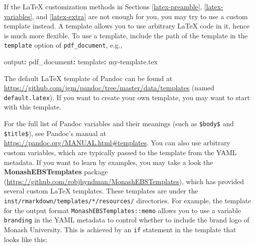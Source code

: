 \documentclass[
  11pt,
]{krantz}
\newenvironment{Shaded}{\begin{snugshade}}{\end{snugshade}}
\newcommand{\AttributeTok}[1]{\textcolor[rgb]{0.61,0.61,0.61}{#1}}
\newcommand{\BuiltInTok}[1]{#1}
\newcommand{\CommentTok}[1]{\textcolor[rgb]{0.37,0.37,0.37}{\textit{#1}}}
\newcommand{\ExtensionTok}[1]{#1}
\newcommand{\FunctionTok}[1]{\textcolor[rgb]{0,0,0}{#1}}
\newcommand{\KeywordTok}[1]{\textcolor[rgb]{0.27,0.27,0.27}{\textbf{#1}}}
\newcommand{\NormalTok}[1]{#1}
\newcommand{\SpecialStringTok}[1]{\textcolor[rgb]{0.5,0.5,0.5}{#1}}
\begin{document}
If the LaTeX customization methods in Sections \ref{latex-preamble}, \ref{latex-variables}, and \ref{latex-extra} are not enough for you, you may try to use a custom template instead. A template allows you to use arbitrary LaTeX code in it, hence is much more flexible. To use a template, include the path of the template in the \texttt{template} option of \texttt{pdf\_document}, e.g.,

\begin{Shaded}
\begin{Highlighting}[]
\FunctionTok{output}\KeywordTok{:}
\AttributeTok{  }\FunctionTok{pdf_document}\KeywordTok{:}
\AttributeTok{    }\FunctionTok{template}\KeywordTok{:}\AttributeTok{ my-template.tex}
\end{Highlighting}
\end{Shaded}

The default LaTeX template of Pandoc can be found at \url{https://github.com/jgm/pandoc/tree/master/data/templates} (named \texttt{default.latex}). If you want to create your own template, you may want to start with this template.

For the full list of Pandoc variables and their meanings (such as \texttt{\$body\$} and \texttt{\$title\$}), see Pandoc's manual at \url{https://pandoc.org/MANUAL.html\#templates}. You can also use arbitrary custom variables, which are typically passed to the template from the YAML metadata. If you want to learn by examples, you may take a look the \textbf{MonashEBSTemplates} package (\url{https://github.com/robjhyndman/MonashEBSTemplates}), which has provided several custom LaTeX templates. These templates are under the \texttt{inst/rmarkdown/templates/*/resources/} directories. For example, the template for the output format \texttt{MonashEBSTemplates::memo} allows you to use a variable \texttt{branding} in the YAML metadata to control whether to include the brand logo of Monash University. This is achieved by an \texttt{if} statement in the template that looks like this:

\begin{Shaded}
\end{Shaded}
\end{document}
